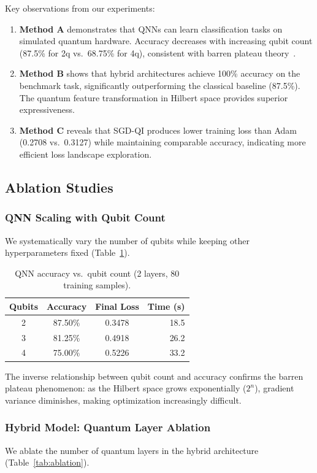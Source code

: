 \documentclass[11pt,a4paper]{article}
\begin{document}
Key observations from our experiments:
\begin{enumerate}
    \item \textbf{Method A} demonstrates that QNNs can learn classification tasks on simulated quantum hardware. Accuracy decreases with increasing qubit count (87.5\% for 2q vs.\ 68.75\% for 4q), consistent with barren plateau theory~\cite{mcclean2018barren}.
    \item \textbf{Method B} shows that hybrid architectures achieve 100\% accuracy on the benchmark task, significantly outperforming the classical baseline (87.5\%). The quantum feature transformation in Hilbert space provides superior expressiveness.
    \item \textbf{Method C} reveals that SGD-QI produces lower training loss than Adam (0.2708 vs.\ 0.3127) while maintaining comparable accuracy, indicating more efficient loss landscape exploration.
\end{enumerate}

\subsection{Ablation Studies}

\subsubsection{QNN Scaling with Qubit Count}
We systematically vary the number of qubits while keeping other hyperparameters fixed (Table~\ref{tab:scaling}).

\begin{table}[h]
\centering
\caption{QNN accuracy vs.\ qubit count (2 layers, 80 training samples).}
\label{tab:scaling}
\begin{tabular}{cccr}
\toprule
Qubits & Accuracy & Final Loss & Time (s) \\
\midrule
2 & 87.50\% & 0.3478 & 18.5 \\
3 & 81.25\% & 0.4918 & 26.2 \\
4 & 75.00\% & 0.5226 & 33.2 \\
\bottomrule
\end{tabular}
\end{table}

The inverse relationship between qubit count and accuracy confirms the barren plateau phenomenon: as the Hilbert space grows exponentially ($2^n$), gradient variance diminishes, making optimization increasingly difficult.

\subsubsection{Hybrid Model: Quantum Layer Ablation}
We ablate the number of quantum layers in the hybrid architecture (Table~\ref{tab:ablation}).
\end{document}
